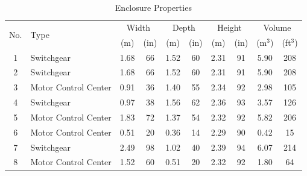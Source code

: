 \documentclass[12pt]{article}
\begin{document}
\begin{table}[ht]
\begin{center}
\caption{Enclosure Properties}
\label{props}
\begin{tabular}{|c|l|c|c|c|c|c|c|c|c|}
\hline
\multirow{2}{*}{No.}   &\multirow{2}{*}{Type}         & \multicolumn{2}{|c|}{Width}  & \multicolumn{2}{|c|}{Depth} & \multicolumn{2}{|c|}{Height}   & \multicolumn{2}{|c|}{Volume}          \\ \cline{3-10}
                       &                              & (m)    & (in)                & (m)     & (in)              & (m)     & (in)                 & (m$^3$)   &  (ft$^3$)                 \\ \hline
1                      & Switchgear                   & 1.68   & 66                  & 1.52    & 60                & 2.31    & 91                   & 5.90      & 208                       \\ \hline
2                      & Switchgear                   & 1.68   & 66                  & 1.52    & 60                & 2.31    & 91                   & 5.90      & 208                       \\ \hline
3                      & Motor Control Center         & 0.91   & 36                  & 1.40    & 55                & 2.34    & 92                   & 2.98      & 105                       \\ \hline
4                      & Switchgear                   & 0.97   & 38                  & 1.56    &  62               & 2.36    & 93                   & 3.57      &  126                       \\ \hline
5                      & Motor Control Center         & 1.83   & 72                  & 1.37    & 54                & 2.32    & 92                   & 5.82      & 206                       \\ \hline
6                      & Motor Control Center         & 0.51   & 20                  & 0.36    & 14                & 2.29    & 90                   & 0.42      & 15                        \\ \hline
7                      & Switchgear                   & 2.49   & 98                  & 1.02    & 40                & 2.39    & 94                   & 6.07      & 214                       \\ \hline
8                      & Motor Control Center         & 1.52   & 60                  & 0.51    & 20                & 2.32    & 92                   & 1.80      & 64                        \\ \hline
\end{tabular}
\end{center}
\end{table}
\end{document}
